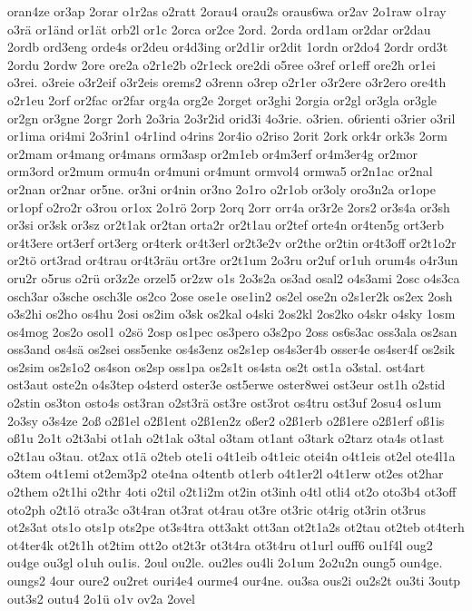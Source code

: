 {oran4ze
or3ap
2orar
o1r2as
o2ratt
2orau4
orau2s
oraus6wa
or2av
2o1raw
o1ray
o3rä
or1änd
or1ät
orb2l
or1c
2orca
or2ce
2ord.
2orda
ord1am
or2dar
or2dau
2ordb
ord3eng
orde4s
or2deu
or4d3ing
or2d1ir
or2dit
1ordn
or2do4
2ordr
ord3t
2ordu
2ordw
2ore
ore2a
o2r1e2b
o2r1eck
ore2di
o5ree
o3ref
or1eff
ore2h
or1ei
o3rei.
o3reie
o3r2eif
o3r2eis
orems2
o3renn
o3rep
o2r1er
o3r2ere
o3r2ero
ore4th
o2r1eu
2orf
or2fac
or2far
org4a
org2e
2orget
or3ghi
2orgia
or2gl
or3gla
or3gle
or2gn
or3gne
2orgr
2orh
2o3ria
2o3r2id
orid3i
4o3rie.
o3rien.
o6rienti
o3rier
o3ril
or1ima
ori4mi
2o3rin1
o4r1ind
o4rins
2or4io
o2riso
2orit
2ork
ork4r
ork3s
2orm
or2mam
or4mang
or4mans
orm3asp
or2m1eb
or4m3erf
or4m3er4g
or2mor
orm3ord
or2mum
ormu4n
or4muni
or4munt
ormvol4
ormwa5
or2n1ac
or2nal
or2nan
or2nar
or5ne.
or3ni
or4nin
or3no
2o1ro
o2r1ob
or3oly
oro3n2a
or1ope
or1opf
o2ro2r
o3rou
or1ox
2o1rö
2orp
2orq
2orr
orr4a
or3r2e
2ors2
or3s4a
or3sh
or3si
or3sk
or3sz
or2t1ak
or2tan
orta2r
or2t1au
or2tef
orte4n
or4ten5g
ort3erb
or4t3ere
ort3erf
ort3erg
or4terk
or4t3erl
or2t3e2v
or2the
or2tin
or4t3off
or2t1o2r
or2tö
ort3rad
or4trau
or4t3räu
ort3re
or2t1um
2o3ru
or2uf
or1uh
orum4s
o4r3un
oru2r
o5rus
o2rü
or3z2e
orzel5
or2zw
o1s
2o3s2a
os3ad
osal2
o4s3ami
2osc
o4s3ca
osch3ar
o3sche
osch3le
os2co
2ose
ose1e
ose1in2
os2el
ose2n
o2s1er2k
os2ex
2osh
o3s2hi
os2ho
os4hu
2osi
os2im
o3sk
os2kal
o4ski
2os2kl
2os2ko
o4skr
o4sky
1osm
os4mog
2os2o
osol1
o2sö
2osp
os1pec
os3pero
o3s2po
2oss
os6s3ac
oss3ala
os2san
oss3and
os4sä
os2sei
oss5enke
os4s3enz
os2s1ep
os4s3er4b
osser4e
os4ser4f
os2sik
os2sim
os2s1o2
os4son
os2sp
oss1pa
os2s1t
os4sta
os2t
ost1a
o3stal.
ost4art
ost3aut
oste2n
o4s3tep
o4sterd
oster3e
ost5erwe
oster8wei
ost3eur
ost1h
o2stid
o2stin
os3ton
osto4s
ost3ran
o2st3rä
ost3re
ost3rot
os4tru
ost3uf
2osu4
os1um
2o3sy
o3s4ze
2oß
o2ß1el
o2ß1ent
o2ß1en2z
oßer2
o2ß1erb
o2ß1ere
o2ß1erf
oß1is
oß1u
2o1t
o2t3abi
ot1ah
o2t1ak
o3tal
o3tam
ot1ant
o3tark
o2tarz
ota4s
ot1ast
o2t1au
o3tau.
ot2ax
ot1ä
o2teb
ote1i
o4t1eib
o4t1eic
otei4n
o4t1eis
ot2el
ote4l1a
o3tem
o4t1emi
ot2em3p2
ote4na
o4tentb
ot1erb
o4t1er2l
o4t1erw
ot2es
ot2har
o2them
o2t1hi
o2thr
4oti
o2til
o2t1i2m
ot2in
ot3inh
o4tl
otli4
ot2o
oto3b4
ot3off
oto2ph
o2t1ö
otra3c
o3t4ran
ot3rat
ot4rau
ot3re
ot3ric
ot4rig
ot3rin
ot3rus
ot2s3at
ots1o
ots1p
ots2pe
ot3s4tra
ott3akt
ott3an
ot2t1a2s
ot2tau
ot2teb
ot4terh
ot4ter4k
ot2t1h
ot2tim
ott2o
ot2t3r
ot3t4ra
ot3t4ru
ot1url
ouff6
ou1f4l
oug2
ou4ge
ou3gl
o1uh
ou1is.
2oul
ou2le.
ou2les
ou4li
2o1um
2o2u2n
oung5
oun4ge.
oungs2
4our
oure2
ou2ret
ouri4e4
ourme4
our4ne.
ou3sa
ous2i
ou2s2t
ou3ti
3outp
out3s2
outu4
2o1ü
o1v
ov2a
2ovel
}
